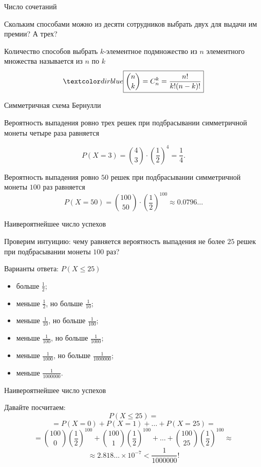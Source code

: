 \begin{frame}{Число сочетаний}

\exmpl Скольким способами можно из десяти сотрудников выбрать двух для выдачи им премии? А трех?

 Количество способов выбрать $k$-элементное подмножество из $n$ элементного множества называется  из $n$ по $k$
$$\acc{\boxed{ \binom {n}{k}=C_n^k=\dfrac{n!}{k!(n-k)!}}}$$

\end{frame}




\begin{frame}{Симметричная схема Бернулли}

\exmpl Вероятность выпадения ровно трех решек при подбрасывании симметричной монеты четыре раза равняется

$$P(X=3)=\binom {4}{3} \cdot \left(\frac 12\right)^4=\boxed{\frac 14}.$$

\exmpl Вероятность выпадения ровно $50$ решек при подбрасывании симметричной монеты $100$ раз равняется
$$P(X=50)=\binom {100}{50}\cdot \left(\frac 12\right)^{100} \approx \boxed{0.0796\ldots}$$

\end{frame}

\begin{frame}{Наивероятнейшее число успехов}

Проверим интуицию: чему равняется вероятность выпадения не более $25$ решек при подбрасывании монеты $100$ раз?

Варианты ответа:
$P(X\leqslant 25)$
\begin{itemize}
\item больше $\frac 12$;
\item меньше $\frac 12$, но больше $\frac{1}{10}$;
\item меньше $\frac{1}{10}$, но больше $\frac{1}{100}$;
\item меньше $\frac{1}{100}$, но больше $\frac{1}{1000}$;
\item меньше $\frac{1}{1000}$, но больше $\frac{1}{1000000}$;
\item меньше $\frac{1}{1000000}$.
\end{itemize}

\end{frame}

\begin{frame}{Наивероятнейшее число успехов}

Давайте посчитаем:
$$P(X\leqslant 25)=$$
$$=P(X=0)+P(X=1)+\ldots+P(X=25)=$$
$$=\binom {100}{0}\left(\frac{1}{2}\right)^{100}+\binom {100}{1}\left(\frac{1}{2}\right)^{100}+\ldots+\binom {100}{25}\left(\frac{1}{2}\right)^{100}\approx$$
$$\approx \boxed{2.818\ldots \times 10^{-7}}< \frac{1}{1000000}!$$

\end{frame}



